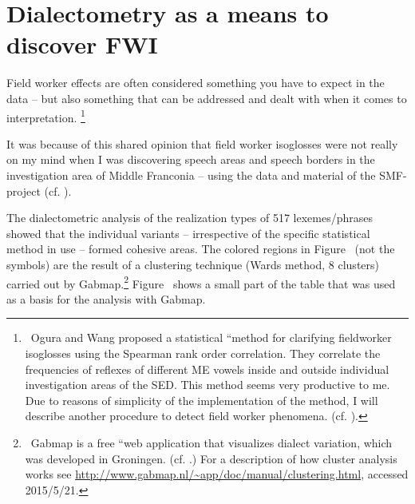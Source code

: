\documentclass[output=paper]{LSP/langsci}
\begin{document}
\section{Dialectometry as a means to discover FWI}
Field worker effects are often considered something you have to expect in the data – but also something that can be addressed and dealt with when it comes to interpretation.
\footnote{\ Ogura and Wang proposed a statistical ``method for clarifying fieldworker isoglosses{\textquotedbl} using the Spearman rank order correlation. They correlate the frequencies of reflexes of different ME vowels inside and outside individual investigation areas of the SED. This method seems very productive to me. Due to reasons of simplicity of the implementation of the method, I will describe another procedure to detect field worker phenomena. (cf. \citealt{ogura_isoglosses_1992}).}

It was because of this shared opinion that field worker isoglosses were not really on my mind when I was discovering speech areas and speech borders in the investigation area of Middle Franconia – using the data and material of the SMF-project (cf. \citealt{mathussek_sprachraume_2014}).

The dialectometric analysis of the realization types of 517 lexemes/phrases showed that the individual variants – irrespective of the specific statistical method in use – formed cohesive areas. The colored regions in Figure~ (not the symbols) are the result of a clustering technique (Ward{\textquotesingle}s method, 8 clusters) carried out by Gabmap.\footnote{\ Gabmap is a free ``web application that visualizes dialect variation{\textquotedbl}, which was developed in Groningen. (cf. \citealt{nerbonne_gabmap_2011}.) For a description of how cluster analysis works see \url{http://www.gabmap.nl/\~app/doc/manual/clustering.html}, accessed 2015/5/21.} Figure~ shows a small part of the table that was used as a basis for the analysis with Gabmap.
\end{document}
